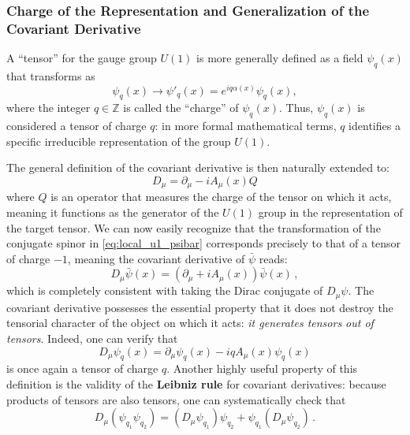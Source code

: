 \subsubsection{Charge of the Representation and Generalization of the Covariant Derivative}

A ``tensor'' for the gauge group \(U(1)\) is more generally defined as a field \(\psi_q(x)\) that transforms as
\begin{equation} \label{eq:general_tensor}
    \psi_q(x) \rightarrow \psi'_q(x) = e^{iq\alpha(x)}\psi_q(x),
\end{equation}
where the integer \(q \in \mathbb{Z}\) is called the ``charge'' of \(\psi_q(x)\). Thus, \(\psi_q(x)\) is considered a tensor of charge \(q\): in more formal mathematical terms, \(q\) identifies a specific irreducible representation of the group \(U(1)\).

The general definition of the covariant derivative is then naturally extended to:
\begin{equation} \label{eq:covariant_general}
    D_\mu = \partial_\mu - iA_\mu(x)Q
\end{equation}
where \(Q\) is an operator that measures the charge of the tensor on which it acts, meaning it functions as the generator of the \(U(1)\) group in the representation of the target tensor. We can now easily recognize that the transformation of the conjugate spinor in \eqref{eq:local_u1_psibar} corresponds precisely to that of a tensor of charge \(-1\), meaning the covariant derivative of \(\bar{\psi}\) reads:
\begin{equation} \label{eq:covariant_conjugate}
    D_\mu\bar{\psi}(x) = (\partial_\mu + iA_\mu(x))\bar{\psi}(x) \, ,
\end{equation}
which is completely consistent with taking the Dirac conjugate of \(D_\mu\psi\). The covariant derivative possesses the essential property that it does not destroy the tensorial character of the object on which it acts: \textit{it generates tensors out of tensors}. Indeed, one can verify that
\begin{equation} \label{eq:tensor_verification}
    D_\mu\psi_q(x) = \partial_\mu\psi_q(x) - iqA_\mu(x)\psi_q(x)
\end{equation}
is once again a tensor of charge \(q\). Another highly useful property of this definition is the validity of the \textbf{Leibniz rule} for covariant derivatives: because products of tensors are also tensors, one can systematically check that
\begin{equation} \label{eq:leibniz_rule}
    D_\mu(\psi_{q_1}\psi_{q_2}) = (D_\mu\psi_{q_1})\psi_{q_2} + \psi_{q_1}(D_\mu\psi_{q_2}) \, .
\end{equation}

